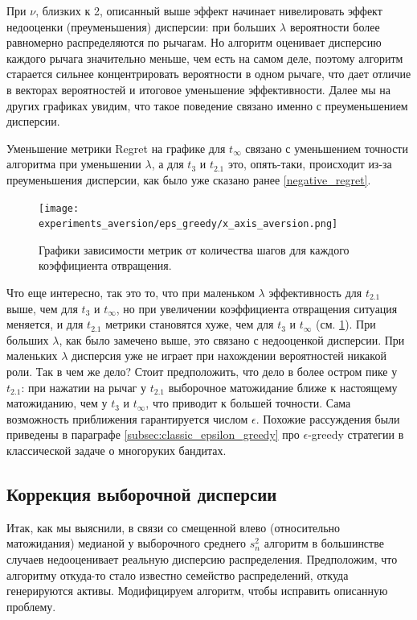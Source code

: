При $\nu$, близких к 2, описанный выше эффект начинает нивелировать эффект недооценки (преуменьшения) дисперсии: при больших $\lambda$ вероятности более равномерно распределяются по рычагам. Но алгоритм оценивает дисперсию каждого рычага значительно меньше, чем есть на самом деле, поэтому алгоритм старается сильнее концентрировать вероятности в одном рычаге, что дает отличие в векторах вероятностей и итоговое уменьшение эффективности. Далее мы на других графиках увидим, что такое поведение связано именно с преуменьшением дисперсии.

Уменьшение метрики Regret на графике для $t_{\infty}$ связано с уменьшением точности алгоритма при уменьшении $\lambda$, а для $t_{3}$ и $t_{2.1}$ это, опять-таки, происходит из-за преуменьшения дисперсии, как было уже сказано ранее \ref{negative_regret}.

\begin{figure}[ht!] %
\centering
\texttt{[image: experiments\_aversion/eps\_greedy/x\_axis\_aversion.png]}
\caption{Графики зависимости метрик от количества шагов для каждого коэффициента отвращения.}
\label{fig:eps_greedy_aversion_selected_aversions}
\end{figure}

Что еще интересно, так это то, что при маленьком $\lambda$ эффективность для $t_{2.1}$ выше, чем для $t_3$ и $t_{\infty}$, но при увеличении коэффициента отвращения ситуация меняется, и  для $t_{2.1}$ метрики становятся хуже, чем для $t_3$ и $t_{\infty}$ (см. \ref{fig:eps_greedy_aversion_selected_aversions}). При больших $\lambda$, как было замечено выше, это связано с недооценкой дисперсии. При маленьких $\lambda$ дисперсия уже не играет при нахождении вероятностей никакой роли. Так в чем же дело? Стоит предположить, что дело в более остром пике у $t_{2.1}$: при нажатии на рычаг у $t_{2.1}$ выборочное матожидание ближе к настоящему матожиданию, чем у $t_3$ и $t_{\infty}$, что приводит к большей точности. Сама возможность приближения гарантируется числом $\epsilon$. Похожие рассуждения были приведены в параграфе \ref{subsec:classic_epsilon_greedy} про $\epsilon$-greedy стратегии в классической задаче о многоруких бандитах.

\subsection{Коррекция выборочной дисперсии}\label{sec:correction_eps_greedy}

Итак, как мы выяснили, в связи со смещенной влево (относительно матожидания) медианой у выборочного среднего $s_n^2$ алгоритм в большинстве случаев недооценивает реальную дисперсию распределения. Предположим, что алгоритму откуда-то стало известно семейство распределений, откуда генерируются активы. Модифицируем алгоритм, чтобы исправить описанную проблему.

